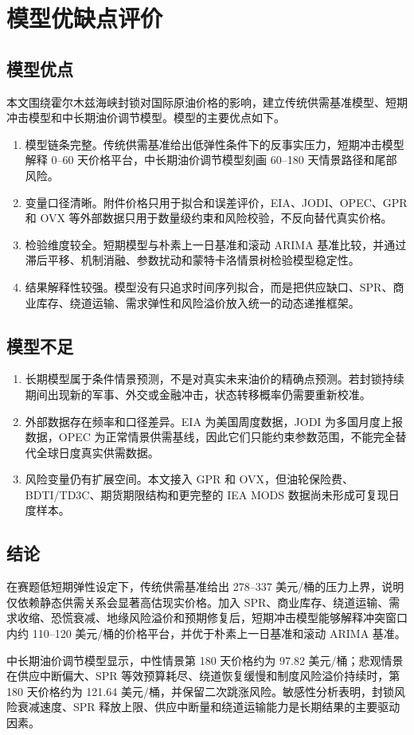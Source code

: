 \section{模型优缺点评价}

\subsection{模型优点}

本文围绕霍尔木兹海峡封锁对国际原油价格的影响，建立传统供需基准模型、短期冲击模型和中长期油价调节模型。模型的主要优点如下。

\begin{enumerate}
  \item 模型链条完整。传统供需基准给出低弹性条件下的反事实压力，短期冲击模型解释 0--60 天价格平台，中长期油价调节模型刻画 60--180 天情景路径和尾部风险。
  \item 变量口径清晰。附件价格只用于拟合和误差评价，EIA、JODI、OPEC、GPR 和 OVX 等外部数据只用于数量级约束和风险校验，不反向替代真实价格。
  \item 检验维度较全。短期模型与朴素上一日基准和滚动 ARIMA 基准比较，并通过滞后平移、机制消融、参数扰动和蒙特卡洛情景树检验模型稳定性。
  \item 结果解释性较强。模型没有只追求时间序列拟合，而是把供应缺口、SPR、商业库存、绕道运输、需求弹性和风险溢价放入统一的动态递推框架。
\end{enumerate}

\subsection{模型不足}

\begin{enumerate}
  \item 长期模型属于条件情景预测，不是对真实未来油价的精确点预测。若封锁持续期间出现新的军事、外交或金融冲击，状态转移概率仍需要重新校准。
  \item 外部数据存在频率和口径差异。EIA 为美国周度数据，JODI 为多国月度上报数据，OPEC 为正常情景供需基线，因此它们只能约束参数范围，不能完全替代全球日度真实供需数据。
  \item 风险变量仍有扩展空间。本文接入 GPR 和 OVX，但油轮保险费、BDTI/TD3C、期货期限结构和更完整的 IEA MODS 数据尚未形成可复现日度样本。
\end{enumerate}

\subsection{结论}

在赛题低短期弹性设定下，传统供需基准给出 278--337 美元/桶的压力上界，说明仅依赖静态供需关系会显著高估现实价格。加入 SPR、商业库存、绕道运输、需求收缩、恐慌衰减、地缘风险溢价和预期修复后，短期冲击模型能够解释冲突窗口内约 110--120 美元/桶的价格平台，并优于朴素上一日基准和滚动 ARIMA 基准。

中长期油价调节模型显示，中性情景第 180 天价格约为 97.82 美元/桶；悲观情景在供应中断偏大、SPR 等效预算耗尽、绕道恢复缓慢和制度风险溢价持续时，第 180 天价格约为 121.64 美元/桶，并保留二次跳涨风险。敏感性分析表明，封锁风险衰减速度、SPR 释放上限、供应中断量和绕道运输能力是长期结果的主要驱动因素。
